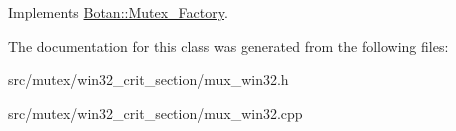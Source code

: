Implements \hyperlink{classBotan_1_1Mutex__Factory_ade19d854cd215d263ebb3654728322db}{Botan\-::\-Mutex\-\_\-\-Factory}.



The documentation for this class was generated from the following files\-:\begin{DoxyCompactItemize}
\item 
src/mutex/win32\-\_\-crit\-\_\-section/mux\-\_\-win32.\-h\item 
src/mutex/win32\-\_\-crit\-\_\-section/mux\-\_\-win32.\-cpp\end{DoxyCompactItemize}
